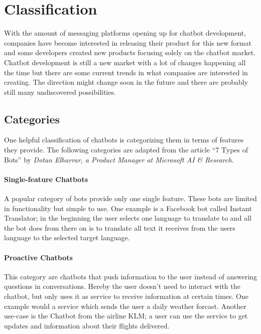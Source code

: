 \section{Classification}
\label{classification}


With the amount of messaging platforms opening up for chatbot development, companies have become interested in releasing their product for this new format and some developers created new products focusing solely on the chatbot market.
\\

Chatbot development is still a new market with a lot of changes happening all the time but there are some current trends in what companies are interested in creating. The direction might change soon in the future and there are probably still many undiscovered possibilities.
\\

\subsection{Categories}

One helpful classification of chatbots is categorizing them in terms of features they provide. The following categories are adapted from the article ``7 Types of Bots'' by \emph{Dotan Elharrar, a Product Manager at Microsoft AI \& Research}\cite{bottypes}.


\paragraph{Single-feature Chatbots}

A popular category of bots provide only one single feature. These bots are limited in functionality but simple to use. One example is a Facebook bot called Instant Translator\cite{instanttranslator}; in the beginning the user selects one language to translate to and all the bot does from there on is to translate all text it receives from the users language to the selected target language.


\paragraph{Proactive Chatbots}

This category are chatbots that push information to the user instead of answering questions in conversations. Hereby the user doesn't need to interact with the chatbot, but only uses it as service to receive information at certain times. One example would a service which sends the user a daily weather forcast. Another use-case is the Chatbot from the airline KLM\cite{klm}; a user can use the service to get updates and information about their flights delivered.


